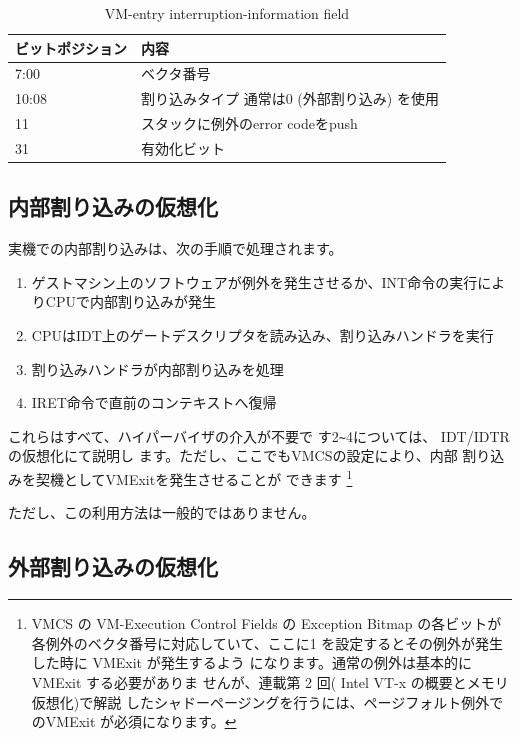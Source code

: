\begin{table}\centering
\begin{tabular}{|p{4.5cm}|p{10cm}|} \hline

ビットポジション & 内容 \\
\hline
7:00             & ベクタ番号 \\
\hline
10:08            & 割り込みタイプ 通常は0 (外部割り込み) を使用 \\
\hline
11               & スタックに例外のerror codeをpush \\
\hline
31               & 有効化ビット \\
\hline
\end{tabular}
\caption{VM-entry interruption-information field}
\label{tab1}
\end{table}

\subsection*{内部割り込みの仮想化}

 実機での内部割り込みは、次の手順で処理されます。

\begin{enumerate}

\item ゲストマシン上のソフトウェアが例外を発生させるか、INT命令の実行によりCPUで内部割り込みが発生
\item CPUはIDT上のゲートデスクリプタを読み込み、割り込みハンドラを実行
\item 割り込みハンドラが内部割り込みを処理
\item IRET命令で直前のコンテキストへ復帰
\end{enumerate}

 これらはすべて、ハイパーバイザの介入が不要で
す2\verb|~|4については、 IDT/IDTR の仮想化にて説明し
ます。ただし、ここでもVMCSの設定により、内部
割り込みを契機としてVMExitを発生させることが
できます
  \footnote{
  VMCS の VM-Execution Control Fields の Exception Bitmap
  の各ビットが各例外のベクタ番号に対応していて、ここに1
  を設定するとその例外が発生した時に VMExit が発生するよう
  になります。通常の例外は基本的に VMExit する必要がありま
  せんが、連載第 2 回( Intel VT-x の概要とメモリ仮想化)で解説
  したシャドーページングを行うには、ページフォルト例外で
  のVMExit が必須になります。
  }

ただし、この利用方法は一般的ではありません。

\subsection*{外部割り込みの仮想化}


